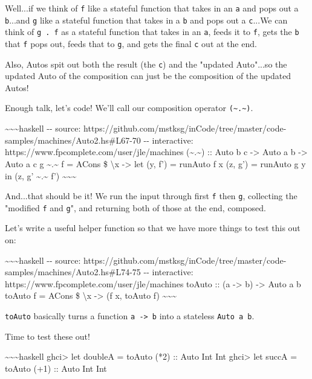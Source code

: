 \documentclass[]{article}
\begin{document}
Well...if we think of \texttt{f} like a stateful function that takes in an
\texttt{a} and pops out a \texttt{b}...and \texttt{g} like a stateful function
that takes in a \texttt{b} and pops out a \texttt{c}...We can think of
\texttt{g\ .\ f} as a stateful function that takes in an \texttt{a}, feeds it to
\texttt{f}, gets the \texttt{b} that \texttt{f} pops out, feeds that to
\texttt{g}, and gets the final \texttt{c} out at the end.

Also, Autos spit out both the result (the \texttt{c}) and the "updated
Auto"...so the updated Auto of the composition can just be the composition of
the updated Autos!

Enough talk, let's code! We'll call our composition operator
\texttt{(\textasciitilde{}.\textasciitilde{})}.

\textasciitilde{}\textasciitilde{}\textasciitilde{}haskell -\/- source:
https://github.com/mstksg/inCode/tree/master/code-samples/machines/Auto2.hs\#L67-70
-\/- interactive: https://www.fpcomplete.com/user/jle/machines
(\textasciitilde{}.\textasciitilde{}) :: Auto b c -\textgreater{} Auto a b
-\textgreater{} Auto a c g \textasciitilde{}.\textasciitilde{} f = ACons \$
\textbackslash{}x -\textgreater{} let (y, f') = runAuto f x (z, g') = runAuto g
y in (z, g' \textasciitilde{}.\textasciitilde{} f')
\textasciitilde{}\textasciitilde{}\textasciitilde{}

And...that should be it! We run the input through first \texttt{f} then
\texttt{g}, collecting the "modified \texttt{f} and \texttt{g}", and returning
both of those at the end, composed.

Let's write a useful helper function so that we have more things to test this
out on:

\textasciitilde{}\textasciitilde{}\textasciitilde{}haskell -\/- source:
https://github.com/mstksg/inCode/tree/master/code-samples/machines/Auto2.hs\#L74-75
-\/- interactive: https://www.fpcomplete.com/user/jle/machines toAuto :: (a
-\textgreater{} b) -\textgreater{} Auto a b toAuto f = ACons \$
\textbackslash{}x -\textgreater{} (f x, toAuto f)
\textasciitilde{}\textasciitilde{}\textasciitilde{}

\texttt{toAuto} basically turns a function \texttt{a\ -\textgreater{}\ b} into a
stateless \texttt{Auto\ a\ b}.

Time to test these out!

\textasciitilde{}\textasciitilde{}\textasciitilde{}haskell ghci\textgreater{}
let doubleA = toAuto (*2) :: Auto Int Int ghci\textgreater{} let succA = toAuto
(+1) :: Auto Int Int
\end{document}
